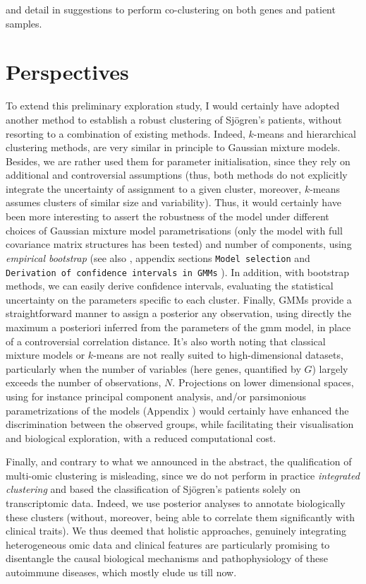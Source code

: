 \documentclass[mainlanguage=english,numlaboratories=2, nofrontcover=true,noaim=false, localbibs, colophon-location=verso-frontcover, oneside, 10pt, localtocs, version=final, nomakeabstract=true]{yathesis}
\begin{document}
and detail in  suggestions to perform co-clustering on both genes and patient samples.

\section{Perspectives}
\label{sec:sjogren-extension}

To extend this preliminary exploration study, I would certainly have adopted another method to establish a robust clustering of Sjögren's patients, without resorting to a combination of existing methods. Indeed, $k$-means and hierarchical clustering methods, are very similar in principle to Gaussian mixture models. Besides, we are rather used them for parameter initialisation, since they rely on additional and controversial assumptions (thus, both methods do not explicitly integrate the uncertainty of assignment to a given cluster, moreover, $k$-means assumes clusters of similar size and variability). Thus, it would certainly have been more interesting to assert the robustness of the model under different choices of Gaussian mixture model parametrisations (only the model with full covariance matrix structures has been tested) and number of components, using \emph{empirical bootstrap} (see also , appendix sections \texttt{Model selection} and \texttt{Derivation of confidence intervals in GMMs} ). In addition, with bootstrap methods, we can easily derive confidence intervals, evaluating the statistical uncertainty on the parameters specific to each cluster. Finally, GMMs provide a straightforward manner to assign a posterior any observation, using directly the maximum a posteriori inferred from the parameters of the \acrshort{gmm} model, in place of a controversial correlation distance.
It's also worth noting that classical mixture models or $k$-means are not really suited to high-dimensional datasets, particularly when the number of variables (here genes, quantified by $G$) largely exceeds the number of observations, $N$. Projections on lower dimensional spaces, using for instance principal component analysis, and/or parsimonious parametrizations of the models (Appendix ) would certainly have enhanced the discrimination between the observed groups, while facilitating their visualisation and biological exploration, with a reduced computational cost.


Finally, and contrary to what we announced in the abstract, the qualification of multi-omic clustering is misleading, since we do not perform in practice \emph{integrated clustering} and based the classification of Sjögren's patients solely on transcriptomic data. Indeed, we use posterior analyses to annotate biologically these clusters (without, moreover, being able to correlate them significantly with clinical traits). We thus deemed that holistic approaches, genuinely integrating heterogeneous omic data and clinical features are particularly promising to disentangle the causal biological mechanisms and pathophysiology of these autoimmune diseases, which mostly elude us till now.
\end{document}
